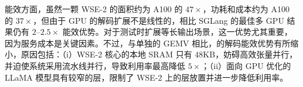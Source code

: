 能效方面，虽然一颗 WSE-2 的面积约为 A100 的 $47\times$，功耗和成本约为 A100 的 $37\times$，但由于 GPU 的解码扩展不是线性的，\sys 相比 SGLang 的最佳多 GPU 结果仍有 $2$--$2.5\times$ 能效优势。对于测试时扩展等长输出场景，这一优势尤其重要，因为服务成本是关键因素。不过，与单独的 GEMV 相比，\sys 的解码能效优势有所缩小，原因包括：（i）WSE-2 核心的本地 SRAM 只有 48KB，妨碍高效张量并行，并迫使系统采用流水线并行，导致利用率最高降低 $5\times$；（ii）面向 GPU 优化的 LLaMA 模型具有较窄的层，限制了 WSE-2 上的层放置并进一步降低利用率。
